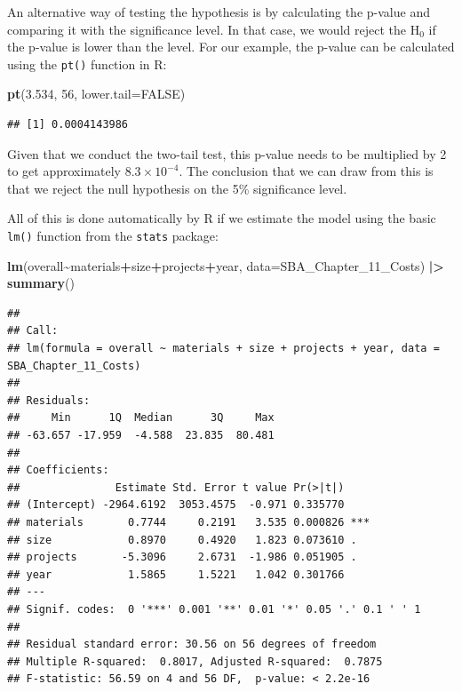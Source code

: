 \documentclass[
]{book}
\newenvironment{Shaded}{\begin{snugshade}}{\end{snugshade}}
\newcommand{\AttributeTok}[1]{\textcolor[rgb]{0.13,0.29,0.53}{#1}}
\newcommand{\ConstantTok}[1]{\textcolor[rgb]{0.56,0.35,0.01}{#1}}
\newcommand{\DecValTok}[1]{\textcolor[rgb]{0.00,0.00,0.81}{#1}}
\newcommand{\FloatTok}[1]{\textcolor[rgb]{0.00,0.00,0.81}{#1}}
\newcommand{\FunctionTok}[1]{\textcolor[rgb]{0.13,0.29,0.53}{\textbf{#1}}}
\newcommand{\NormalTok}[1]{#1}
\newcommand{\SpecialCharTok}[1]{\textcolor[rgb]{0.81,0.36,0.00}{\textbf{#1}}}
\theoremstyle{definition}
\theoremstyle{definition}
\theoremstyle{definition}
\theoremstyle{definition}
\theoremstyle{remark}
\begin{document}
An alternative way of testing the hypothesis is by calculating the p-value and comparing it with the significance level. In that case, we would reject the H\(_0\) if the p-value is lower than the level. For our example, the p-value can be calculated using the \texttt{pt()} function in R:

\begin{Shaded}
\begin{Highlighting}[]
\FunctionTok{pt}\NormalTok{(}\FloatTok{3.534}\NormalTok{, }\DecValTok{56}\NormalTok{, }\AttributeTok{lower.tail=}\ConstantTok{FALSE}\NormalTok{)}
\end{Highlighting}
\end{Shaded}

\begin{verbatim}
## [1] 0.0004143986
\end{verbatim}

Given that we conduct the two-tail test, this p-value needs to be multiplied by 2 to get approximately \ensuremath{8.3\times 10^{-4}}. The conclusion that we can draw from this is that we reject the null hypothesis on the 5\% significance level.

All of this is done automatically by R if we estimate the model using the basic \texttt{lm()} function from the \texttt{stats} package:

\begin{Shaded}
\begin{Highlighting}[]
\FunctionTok{lm}\NormalTok{(overall}\SpecialCharTok{\textasciitilde{}}\NormalTok{materials}\SpecialCharTok{+}\NormalTok{size}\SpecialCharTok{+}\NormalTok{projects}\SpecialCharTok{+}\NormalTok{year, }\AttributeTok{data=}\NormalTok{SBA\_Chapter\_11\_Costs) }\SpecialCharTok{|\textgreater{}}
    \FunctionTok{summary}\NormalTok{()}
\end{Highlighting}
\end{Shaded}

\begin{verbatim}
## 
## Call:
## lm(formula = overall ~ materials + size + projects + year, data = SBA_Chapter_11_Costs)
## 
## Residuals:
##     Min      1Q  Median      3Q     Max 
## -63.657 -17.959  -4.588  23.835  80.481 
## 
## Coefficients:
##               Estimate Std. Error t value Pr(>|t|)    
## (Intercept) -2964.6192  3053.4575  -0.971 0.335770    
## materials       0.7744     0.2191   3.535 0.000826 ***
## size            0.8970     0.4920   1.823 0.073610 .  
## projects       -5.3096     2.6731  -1.986 0.051905 .  
## year            1.5865     1.5221   1.042 0.301766    
## ---
## Signif. codes:  0 '***' 0.001 '**' 0.01 '*' 0.05 '.' 0.1 ' ' 1
## 
## Residual standard error: 30.56 on 56 degrees of freedom
## Multiple R-squared:  0.8017, Adjusted R-squared:  0.7875 
## F-statistic: 56.59 on 4 and 56 DF,  p-value: < 2.2e-16
\end{verbatim}
\end{document}
